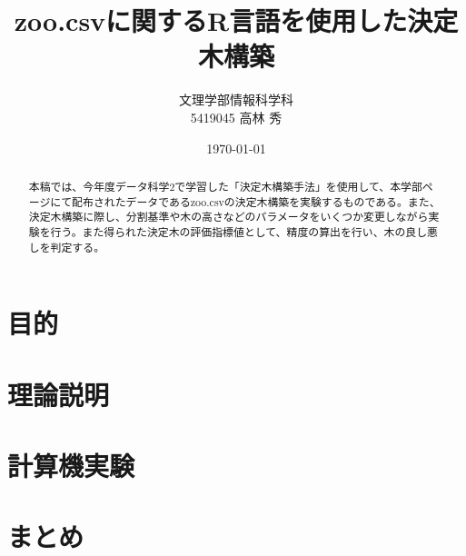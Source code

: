 \documentclass[dvipdfmx]{jsarticle}
\title{zoo.csvに関するR言語を使用した決定木構築}
\author{文理学部情報科学科\\5419045 高林 秀}
\date{\today}
\begin{document}
\maketitle

\begin{abstract}
  本稿では、今年度データ科学2で学習した「決定木構築手法」を使用して、本学部ページにて配布されたデータであるzoo.csvの決定木構築を実験するものである。また、決定木構築に際し、分割基準や木の高さなどのパラメータをいくつか変更しながら実験を行う。また得られた決定木の評価指標値として、精度の算出を行い、木の良し悪しを判定する。
\end{abstract}

\section{目的}
\section{理論説明}
\section{計算機実験}
\section{まとめ}
\end{document}
